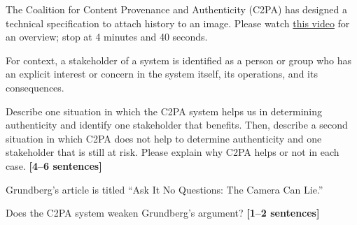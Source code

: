\documentclass{csci1430}
\begin{document}
\begin{answer}[height=11]

\end{answer}
    
\pagebreak

The Coalition for Content Provenance and Authenticity (C2PA) has designed a technical specification to attach history to an image. Please watch \href{https://www.youtube.com/watch?v=hA0ZjqakEF8}{this video} for an overview; stop at 4 minutes and 40 seconds.

For context, a stakeholder of a system is identified as a person or group who has an explicit interest or concern in the system itself, its operations, and its consequences.
    
\begin{subquestion}[points=4]
Describe one situation in which the C2PA system helps us in determining authenticity and identify one stakeholder that benefits. Then, describe a second situation in which C2PA does not help to determine authenticity and one stakeholder that is still at risk. Please explain why C2PA helps or not in each case. \textbf{[4--6 sentences]}
\end{subquestion}

\begin{answer}[height=12]

\end{answer}

\begin{subquestion}[points=2]
Grundberg's article is titled ``Ask It No Questions: The Camera Can Lie.''

Does the C2PA system weaken Grundberg's argument? \textbf{[1--2 sentences]}
\end{subquestion}

\begin{answer}[height=8]

\end{answer}

\pagebreak
\end{document}
